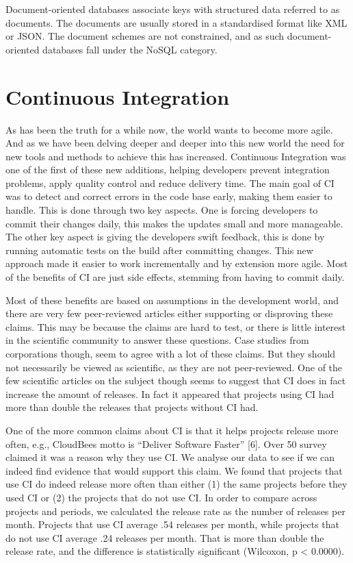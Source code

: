 Document-oriented databases associate keys with structured data referred to as documents. The documents are usually stored in a standardised format like XML or JSON\cite[p.~9]{nosql-ntnu}. The document schemes are not constrained, and as such document-oriented databases fall under the NoSQL category.

\section{Continuous Integration}
As has been the truth for a while now, the world wants to become more agile. And as we have been delving deeper and deeper into this new world the need for new tools and methods to achieve this has increased. Continuous Integration was one of the first of these new additions, helping developers prevent integration problems, apply quality control and reduce delivery time. The main goal of CI was to detect and correct errors in the code base early, making them easier to handle. This is done through two key aspects. One is forcing developers to commit their changes daily, this makes the updates small and more manageable. The other key aspect is giving the developers swift feedback, this is done by running automatic tests on the build after committing changes. This new approach made it easier to work incrementally and by extension more agile. Most of the benefits of CI are just side effects, stemming from having to commit daily.

Most of these benefits are based on assumptions in the development world, and there are very few peer-reviewed articles either supporting or disproving these claims. This may be because the claims are hard to test, or there is little interest in the scientific community to answer these questions. Case studies from corporations though, seem to agree with a lot of these claims. But they should not necessarily be viewed as scientific, as they are not peer-reviewed. One of the few scientific articles on the subject though seems to suggest that CI does in fact increase the amount of releases. In fact it appeared that projects using CI had more than double the releases that projects without CI had. 

\begin{displayquote}
One of the more common claims about CI is that it helps
projects release more often, e.g., CloudBees motto is “Deliver
Software Faster” [6]. Over 50%
survey claimed it was a reason why they use CI. We analyse
our data to see if we can indeed find evidence that would
support this claim.
We found that projects that use CI do indeed release more
often than either (1) the same projects before they used CI
or (2) the projects that do not use CI. In order to compare
across projects and periods, we calculated the release rate
as the number of releases per month. Projects that use CI
average .54 releases per month, while projects that do not
use CI average .24 releases per month. That is more than
double the release rate, and the difference is statistically
significant (Wilcoxon, p < 0.0000)\cite{hilton}.
\end{displayquote}

